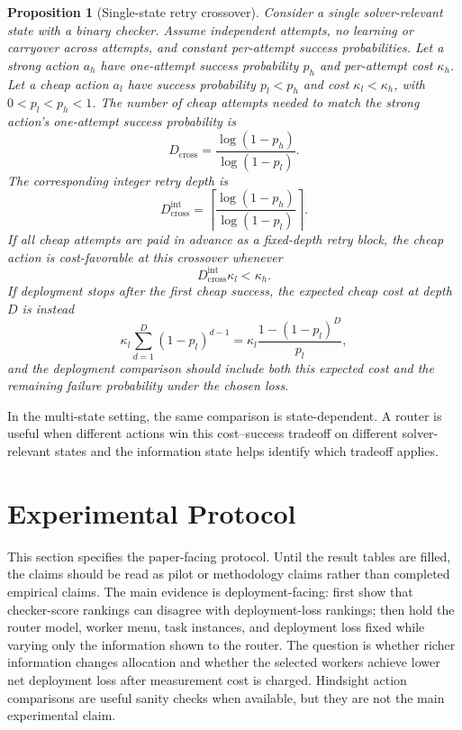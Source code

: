 \documentclass{article}
\newtheorem{proposition}{Proposition}
\begin{document}
\begin{proposition}[Single-state retry crossover]
\label{prop:crossover}
Consider a single solver-relevant state with a binary checker.
Assume independent attempts, no learning or carryover across attempts, and constant per-attempt success probabilities.
Let a strong action $a_h$ have one-attempt success probability $p_h$ and per-attempt cost $\kappa_h$.
Let a cheap action $a_l$ have success probability $p_l<p_h$ and cost $\kappa_l<\kappa_h$, with $0<p_l<p_h<1$.
The number of cheap attempts needed to match the strong action's one-attempt success probability is
\[
D_{\mathrm{cross}}
=
\frac{\log(1-p_h)}{\log(1-p_l)}.
\]
The corresponding integer retry depth is
\[
D_{\mathrm{cross}}^{\mathrm{int}}
=
\left\lceil
\frac{\log(1-p_h)}{\log(1-p_l)}
\right\rceil .
\]
If all cheap attempts are paid in advance as a fixed-depth retry block, the cheap action is cost-favorable at this crossover whenever
\[
D_{\mathrm{cross}}^{\mathrm{int}}\kappa_l < \kappa_h.
\]
If deployment stops after the first cheap success, the expected cheap cost at depth $D$ is instead
\[
\kappa_l\sum_{d=1}^{D}(1-p_l)^{d-1}
=
\kappa_l\frac{1-(1-p_l)^D}{p_l},
\]
and the deployment comparison should include both this expected cost and the remaining failure probability under the chosen loss.
\end{proposition}

In the multi-state setting, the same comparison is state-dependent.
A router is useful when different actions win this cost--success tradeoff on different solver-relevant states and the information state helps identify which tradeoff applies.

\section{Experimental Protocol}
\label{sec:experiments}

This section specifies the paper-facing protocol.
Until the result tables are filled, the claims should be read as pilot or methodology claims rather than completed empirical claims.
The main evidence is deployment-facing: first show that checker-score rankings can disagree with deployment-loss rankings; then hold the router model, worker menu, task instances, and deployment loss fixed while varying only the information shown to the router.
The question is whether richer information changes allocation and whether the selected workers achieve lower net deployment loss after measurement cost is charged.
Hindsight action comparisons are useful sanity checks when available, but they are not the main experimental claim.
\end{document}
